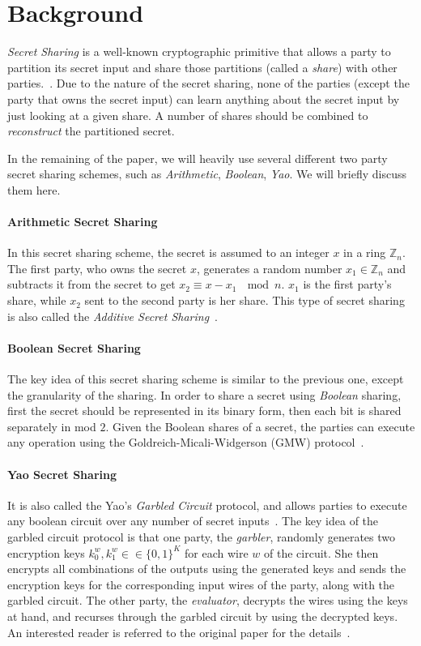 \documentclass{llncs}
\begin{document}
\section{Background}
\label{sec:background}

\emph{Secret Sharing} is a well-known cryptographic primitive that allows a party to partition its secret input and share those partitions (called a \emph{share}) with other parties.~\cite{cite:shamir1979share}. Due to the nature of the secret sharing, none of the parties (except the party that owns the secret input) can learn anything about the secret input by just looking at a given share. A number of shares should be combined to \emph{reconstruct} the partitioned secret. 

In the remaining of the paper, we will heavily use several different two party secret sharing schemes, such as \emph{Arithmetic}, \emph{Boolean}, \emph{Yao}. We will briefly discuss them here.

\paragraph{Arithmetic Secret Sharing} In this secret sharing scheme, the secret is assumed to an integer $x$ in a ring $\mathbb{Z}_n$. The first party, who owns the secret $x$, generates a random number $x_1 \in \mathbb{Z}_n$ and subtracts it from the secret to get $x_2 \equiv x - x_1~\mod{n}$. $x_1$ is the first party's share, while $x_2$ sent to the second party is her share. This type of secret sharing is also called the \emph{Additive Secret Sharing}~\cite{cite:cramer2000general}. 

\paragraph{Boolean Secret Sharing} The key idea of this secret sharing scheme is similar to the previous one,  except the granularity of the sharing. In order to share a secret using \emph{Boolean} sharing, first the secret should be represented in its binary form, then each bit is shared separately in mod $2$. Given the Boolean shares of a secret, the parties can execute any operation using the Goldreich-Micali-Widgerson (GMW) protocol~\cite{cite:goldwasser1987play}. 

\paragraph{Yao Secret Sharing} It is also called the Yao's \emph{Garbled Circuit} protocol, and allows parties to execute any boolean circuit over any number of secret inputs~\cite{cite:yao1986generate}. The key idea of the garbled circuit protocol is that one party, the \emph{garbler}, randomly generates two encryption keys $k^w_0, k^w_1 \in \in \{0,1\}^K$ for each wire $w$ of the circuit. She then encrypts all combinations of the outputs using the generated keys and sends the encryption keys for the corresponding input wires of the party, along with the garbled circuit. The other party, the \emph{evaluator}, decrypts the wires using the keys at hand, and recurses through the garbled circuit by using the decrypted keys. An interested reader is referred to the original paper for the details~\cite{cite:yao1986generate}. 
\end{document}
